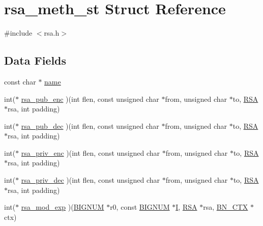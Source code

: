 \hypertarget{structrsa__meth__st}{}\section{rsa\+\_\+meth\+\_\+st Struct Reference}
\label{structrsa__meth__st}


{\ttfamily \#include $<$rsa.\+h$>$}

\subsection*{Data Fields}
\begin{DoxyCompactItemize}
\item 
const char $\ast$ \hyperlink{structrsa__meth__st_afcd1706c9144e6d6eee6127661ae3be2}{name}
\item 
int($\ast$ \hyperlink{structrsa__meth__st_acdaceecccf20cc52eac3d30be6bddd40}{rsa\+\_\+pub\+\_\+enc} )(int flen, const unsigned char $\ast$from, unsigned char $\ast$to, \hyperlink{crypto_2ossl__typ_8h_a9ad4496a11f0a9f686bea793cb97f8b5}{R\+SA} $\ast$rsa, int padding)
\item 
int($\ast$ \hyperlink{structrsa__meth__st_ac1b08f362dd1e4154a35e975861e727e}{rsa\+\_\+pub\+\_\+dec} )(int flen, const unsigned char $\ast$from, unsigned char $\ast$to, \hyperlink{crypto_2ossl__typ_8h_a9ad4496a11f0a9f686bea793cb97f8b5}{R\+SA} $\ast$rsa, int padding)
\item 
int($\ast$ \hyperlink{structrsa__meth__st_a2a26ad2abad414c004105b98d6831239}{rsa\+\_\+priv\+\_\+enc} )(int flen, const unsigned char $\ast$from, unsigned char $\ast$to, \hyperlink{crypto_2ossl__typ_8h_a9ad4496a11f0a9f686bea793cb97f8b5}{R\+SA} $\ast$rsa, int padding)
\item 
int($\ast$ \hyperlink{structrsa__meth__st_ac9e2e6498c75d60918a1fdb8b889be3a}{rsa\+\_\+priv\+\_\+dec} )(int flen, const unsigned char $\ast$from, unsigned char $\ast$to, \hyperlink{crypto_2ossl__typ_8h_a9ad4496a11f0a9f686bea793cb97f8b5}{R\+SA} $\ast$rsa, int padding)
\item 
int($\ast$ \hyperlink{structrsa__meth__st_a88f188147ee4471bc6286ca125be2f53}{rsa\+\_\+mod\+\_\+exp} )(\hyperlink{crypto_2ossl__typ_8h_a6fb19728907ec6515e4bfb716bffa141}{B\+I\+G\+N\+UM} $\ast$r0, const \hyperlink{crypto_2ossl__typ_8h_a6fb19728907ec6515e4bfb716bffa141}{B\+I\+G\+N\+UM} $\ast$\hyperlink{md5__locl_8h_a0f4960a12fc727c645562ca75ab0ec00}{I}, \hyperlink{crypto_2ossl__typ_8h_a9ad4496a11f0a9f686bea793cb97f8b5}{R\+SA} $\ast$rsa, \hyperlink{crypto_2ossl__typ_8h_a0b235a35b7dd7922c097571ecd90e2bc}{B\+N\+\_\+\+C\+TX} $\ast$ctx)

\end{DoxyCompactItemize}
